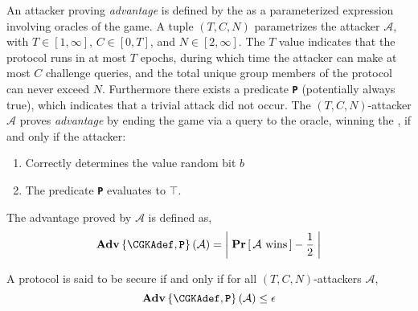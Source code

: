 An attacker proving \emph{advantage} is defined by the \CGKAsec as a parameterized expression involving oracles of the game.
A tuple \((T, C, N)\) parametrizes the attacker \(\mathcal{A}\), with \(T \in \left[1, \infty \right]\), \(C \in \left[0, T \right]\), and \(N \in \left[2, \infty \right]\).
The \(T\) value indicates that the protocol runs in at most \(T\) epochs, during which time the attacker can make at most \(C\) challenge queries, and the total unique group members of the protocol can never exceed \(N\).
Furthermore there exists a predicate \textbf{\texttt{P}} (potentially always true), which indicates that a trivial attack did not occur.
The \((T, C, N)\)-attacker \(\mathcal{A}\) proves \emph{advantage} by ending the game via a query to the  oracle, winning the \CGKAsec, if and only if the attacker:

\begin{enumerate}
\item Correctly determines the value random bit \(b\)
\item The predicate \textbf{\texttt{P}} evaluates to \(\top\).
\end{enumerate}
\vspace{\parsep}

\begin{definition}
The advantage proved by $\mathcal{A}$ is defined as,
$$ \normalfont{\textbf{Adv}}\left\{\CGKAdef,\textbf{\texttt{P}}\right\}(\mathcal{A})  = \left|\; \textbf{Pr}\left[ \,\mathcal{A}\text{ wins}\, \right] - \frac{1}{2} \;\right| $$
\end{definition}

\begin{definition}  
\label{def:CGKA-Security}
A  protocol is said to be secure if and only if for all $(T, C, N)$-attackers $\mathcal{A}$,
$$ \normalfont\textbf{Adv}\left\{\CGKAdef,\textbf{\texttt{P}}\right\}(\mathcal{A}) \leq \epsilon $$
\end{definition}

